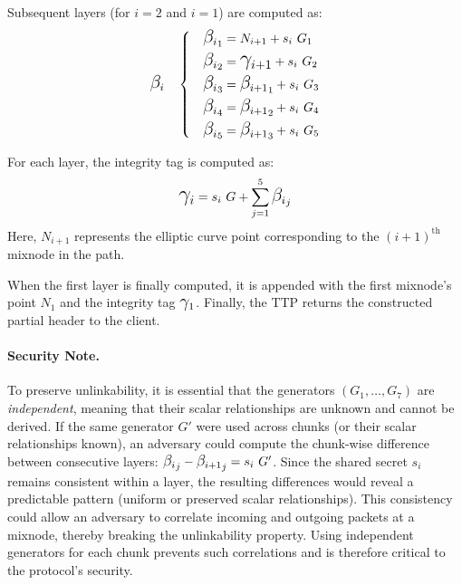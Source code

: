 \noindent
Subsequent layers (for $ i = 2 $ and $ i = 1 $) are computed as:
\begin{equation}
\BETA_i \quad \left\{ \quad
\begin{aligned}
    {\BETA_i}_1 &= N_{i+1} + s_i \ G_1\\
    {\BETA_i}_2 &= \GAMMA_{i+1} + s_i \ G_2 \\
    {\BETA_i}_3 &= {\BETA_{i+1}}_1 + s_i \ G_3 \\
    {\BETA_i}_4 &= {\BETA_{i+1}}_2 + s_i \ G_4 \\
    {\BETA_i}_5 &= {\BETA_{i+1}}_3 + s_i \ G_5 \\
\end{aligned}
\right.
\label{eq:layer_i}
\end{equation}

\noindent
For each layer, the integrity tag is computed as:
\begin{equation}
\GAMMA_i = s_i \ G + \sum_{j=1}^{5} {\BETA_i}_j
\label{eq:integrity}
\end{equation}
Here, $ N_{i+1} $ represents the elliptic curve point corresponding to the $ (i+1)^\text{th} $ mixnode in the path.

When the first layer is finally computed, it is appended with the first mixnode’s point $ N_1 $ and the integrity tag $ \GAMMA_1 $.
Finally, the TTP returns the constructed partial header to the client.

\paragraph{\textbf{Security Note.}}\label{note:security_why_indep_generators}
To preserve unlinkability, it is essential that the generators $ (G_1, \dots, G_7) $ are \textit{independent}, meaning that their scalar relationships are unknown and cannot be derived.
If the same generator $ G' $ were used across chunks (or their scalar relationships known), an adversary could compute the chunk-wise difference between consecutive layers: $ {\BETA_i}_j - {\BETA_{i+1}}_j = s_i \ G' $.
Since the shared secret $ s_i $ remains consistent within a layer, the resulting differences would reveal a predictable pattern (uniform or preserved scalar relationships).
This consistency could allow an adversary to correlate incoming and outgoing packets at a mixnode, thereby breaking the unlinkability property.
Using independent generators for each chunk prevents such correlations and is therefore critical to the protocol's security.  

